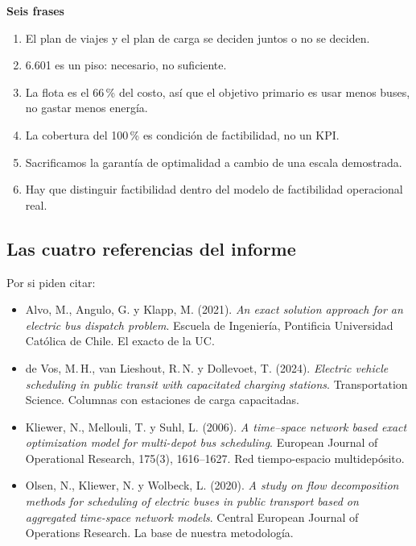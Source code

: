 \documentclass[11pt,a4paper,parskip=half]{scrartcl}
\begin{document}
\begin{clave}
\textbf{Seis frases}
\begin{enumerate}
  \item El plan de viajes y el plan de carga se deciden juntos o no se deciden.
  \item 6.601 es un piso: necesario, no suficiente.
  \item La flota es el 66\,\% del costo, así que el objetivo primario es usar menos buses, no gastar menos energía.
  \item La cobertura del 100\,\% es condición de factibilidad, no un KPI.
  \item Sacrificamos la garantía de optimalidad a cambio de una escala demostrada.
  \item Hay que distinguir factibilidad dentro del modelo de factibilidad operacional real.
\end{enumerate}
\end{clave}

\subsection*{Las cuatro referencias del informe}
Por si piden citar:
\begin{itemize}
  \item Alvo, M., Angulo, G. y Klapp, M. (2021). \emph{An exact solution approach for an electric bus dispatch problem}. Escuela de Ingeniería, Pontificia Universidad Católica de Chile. El exacto de la UC.
  \item de Vos, M.\,H., van Lieshout, R.\,N. y Dollevoet, T. (2024). \emph{Electric vehicle scheduling in public transit with capacitated charging stations}. Transportation Science. Columnas con estaciones de carga capacitadas.
  \item Kliewer, N., Mellouli, T. y Suhl, L. (2006). \emph{A time--space network based exact optimization model for multi-depot bus scheduling}. European Journal of Operational Research, 175(3), 1616--1627. Red tiempo-espacio multidepósito.
  \item Olsen, N., Kliewer, N. y Wolbeck, L. (2020). \emph{A study on flow decomposition methods for scheduling of electric buses in public transport based on aggregated time-space network models}. Central European Journal of Operations Research. La base de nuestra metodología.
\end{itemize}
\end{document}
